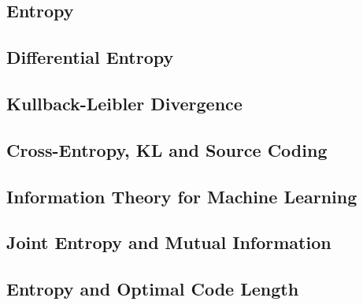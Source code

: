 
\subsection{Entropy}


\subsection{Differential Entropy}


\subsection{Kullback-Leibler Divergence}


\subsection{Cross-Entropy, KL and Source Coding}


\subsection{Information Theory for Machine Learning}


\subsection{Joint Entropy and Mutual Information}


\subsection{Entropy and Optimal Code Length}




